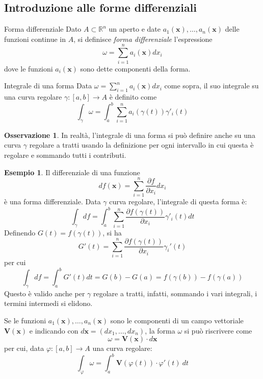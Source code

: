 \documentclass[11pt, a4paper]{scrartcl}
\theoremstyle{definition}
\newtheorem{esempio}{Esempio}
\numberwithin{esempio}{section}
\theoremstyle{definition}
\newtheorem{obs}{Osservazione}
\numberwithin{obs}{section}
\numberwithin{nota}{section}
\numberwithin{equation}{subsection}
\begin{document}
\subsection{Introduzione alle forme differenziali}
\begin{definizione}
	{Forma differenziale}{}
	Dato $A \subset \mathbb{R}^n$ un aperto e date $a_1(\mathbf{x} ), \ldots, a_n (\mathbf{x} )$ delle funzioni continue in $A$, si definisce \textit{forma differenziale} l'espressione
	\[
	\omega = \sum_{i=1}^{n} a_i (\mathbf{x} ) dx_i
	\] 
dove le funzioni $a_i\mathbf{(x)} $ sono dette componenti della forma.
\end{definizione}
\begin{definizione}
	{Integrale di una forma}{}
	Data $\omega = \sum_{i=1}^{n} a_i(\mathbf{x} ) dx_i$ come sopra, il suo integrale su una curva regolare $\gamma:\left[ a,b \right] \to A$ \`e definito come
	\[
	\int_{\gamma} \omega = \int_{a} ^b \sum_{i=1}^{n} a_i(\gamma(t)) \gamma'_i(t)
	\] 
\end{definizione}
\begin{obs}
	In realt\`a, l'integrale di una forma si pu\`o definire anche su una curva $\gamma$ regolare a tratti usando la definizione per ogni intervallo in cui questa \`e regolare e sommando tutti i contributi.
\end{obs}
\begin{esempio}
Il differenziale di una funzione
\[
df(\mathbf{x} ) = \sum_{i=1}^{n} \frac{\partial f}{\partial x_i} dx_i
\] 
\`e una forma differenziale.
Data $\gamma$ curva regolare, l'integrale di questa forma \`e:
\[
\int_{\gamma}  df = \int_{a} ^b \sum_{i=1}^{n} \frac{\partial f(\gamma(t))}{\partial x_i} \gamma'_i(t) dt 
\] 
Definendo $G(t) = f(\gamma(t))$, si ha
\[
G'(t) = \sum_{i=1}^{n} \frac{\partial f(\gamma(t))}{\partial x_i} \gamma_i'(t)
\] 
per cui
\[
\int_{\gamma} df = \int_{a} ^b G'(t) dt = G(b) - G(a) = f(\gamma(b)) - f(\gamma(a))
\] 
Questo \`e valido anche per $\gamma$ regolare a tratti, infatti, sommando i vari integrali, i termini intermedi si elidono.
\end{esempio}
Se le funzioni $a_1(\mathbf{x} ), \ldots, a_n(\mathbf{x} )$ sono le componenti di un campo vettoriale $\mathbf{V} (\mathbf{x})$ e indicando con $d\mathbf{x} = (dx_1, \ldots, dx_n)$, la forma $\omega$ si pu\`o riscrivere come
\begin{equation*}
	\omega = \mathbf{V} (\mathbf{x} ) \cdot d\mathbf{x} 
\end{equation*}
per cui, data $\varphi:\left[ a,b \right] \to A $ una curva regolare:
\[
\int_{\varphi } \omega = \int_{a} ^b \mathbf{V} (\varphi (t)) \cdot \varphi '(t) \ dt 
\] 
\end{document}
